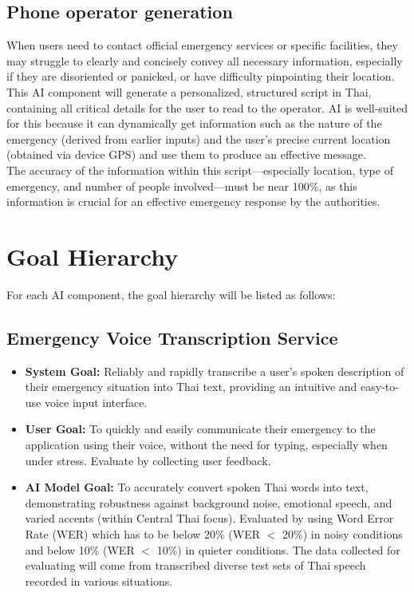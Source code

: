 \subsection{Phone operator generation}
\label{subsec:ai_comp_phone_operator}
When users need to contact official emergency services or specific facilities, they may struggle to clearly and concisely convey all necessary information, especially if they are disoriented or panicked, or have difficulty pinpointing their location.\\
\indent This AI component will generate a personalized, structured script in Thai, containing all critical details for the user to read to the operator. AI is well-suited for this because it can dynamically get information such as the nature of the emergency (derived from earlier inputs) and the user's precise current location (obtained via device GPS) and use them to produce an effective message.\\
\indent The accuracy of the information within this script—especially location, type of emergency, and number of people involved—must be near 100\%, as this information is crucial for an effective emergency response by the authorities.


\section{Goal Hierarchy}
\label{sec:goal_hierarchy}
For each AI component, the goal hierarchy will be listed as follows:

\subsection{Emergency Voice Transcription Service}
\label{subsec:goal_voice_transcription}
\begin{itemize}
    \item \textbf{System Goal:} Reliably and rapidly transcribe a user's spoken description of their emergency situation into Thai text, providing an intuitive and easy-to-use voice input interface.
    \item \textbf{User Goal:} To quickly and easily communicate their emergency to the application using their voice, without the need for typing, especially when under stress. Evaluate by collecting user feedback.
    \item \textbf{AI Model Goal:} To accurately convert spoken Thai words into text, demonstrating robustness against background noise, emotional speech, and varied accents (within Central Thai focus). Evaluated by using Word Error Rate (WER) which has to be below 20\% (WER $<$ 20\%) in noisy conditions and below 10\% (WER $<$ 10\%) in quieter conditions. The data collected for evaluating will come from transcribed diverse test sets of Thai speech recorded in various situations.
\end{itemize}

